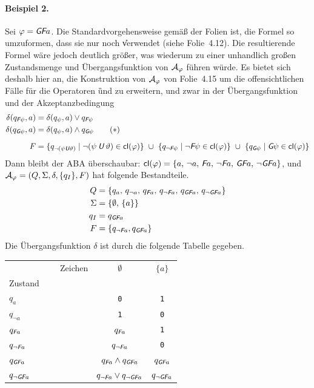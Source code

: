 \documentclass[fontsize=11pt, twoside=false, numbers=autoenddot]{scrbook}
\begin{document}
\paragraph*{Beispiel 2.}
Sei $\varphi = \textit{\textsf{G}}\textit{\textsf{F}} a$.
Die Standardvorgehensweise gemäß der Folien ist,
die Formel so umzuformen, dass sie nur noch \U verwendet
(siehe Folie~4.12).
Die resultierende Formel wäre jedoch deutlich größer,
was wiederum zu einer unhandlich großen Zustandsmenge und Übergangsfunktion von $\mathcal{A}_\varphi$ führen würde.
Es bietet sich deshalb hier an, die Konstruktion von $\mathcal{A}_\varphi$ von Folie~4.15
um die offensichtlichen Fälle für die Operatoren \G und \F zu erweitern,
und zwar in der Übergangsfunktion und der Akzeptanzbedingung
%
\begin{align*}
  \delta(q_{\textit{\textsf{F}}\psi},a) & = \delta(q_\psi,a) \lor q_{\textit{\textsf{F}}\psi}  \\
  \delta(q_{\textit{\textsf{G}}\psi},a) & = \delta(q_\psi,a) \land q_{\textit{\textsf{G}}\psi} \tag{$*$}\\[.4\baselineskip]
  F & = \{q_{\lnot(\psi\mathbin{\textit{\textsf{U}}} \vartheta)} \mid \lnot(\psi\mathbin{\textit{\textsf{U}}} \vartheta) \in \textsf{cl}(\varphi) \}
        ~\cup~ \{q_{\lnot\textit{\textsf{F}}\psi} \mid \lnot\textit{\textsf{F}}\psi \in \textsf{cl}(\varphi) \}
        ~\cup~ \{q_{\textit{\textsf{G}}\psi} \mid \textit{\textsf{G}}\psi \in \textsf{cl}(\varphi) \}
\end{align*}
%
Dann bleibt der ABA überschaubar: $\textsf{cl}(\varphi) = \{a,\,\lnot a,\,\textit{\textsf{F}} a,\,\lnot \textit{\textsf{F}} a,\,\textit{\textsf{G}}\textit{\textsf{F}} a,\,\lnot\textit{\textsf{G}}\textit{\textsf{F}} a\}$,
und $\mathcal{A}_\varphi = (Q,\Sigma,\delta,\{q_I\},F)$ hat folgende Bestandteile.
%
\begin{align*}
  Q      & = \{q_a,\,q_{\lnot a},\,q_{\textit{\textsf{F}} a},\,q_{\lnot\textit{\textsf{F}} a},\,q_{\textit{\textsf{G}}\textit{\textsf{F}} a},\,q_{\lnot\textit{\textsf{G}}\textit{\textsf{F}} a}\} \\
  \Sigma & = \{\emptyset,\,\{a\}\} \\
  q_I    & = q_{\textit{\textsf{G}}\textit{\textsf{F}} a} \\
  F      & = \{q_{\lnot\textit{\textsf{F}} a},q_{\textit{\textsf{G}}\textit{\textsf{F}} a}\}
\end{align*}
%
Die Übergangsfunktion $\delta$ ist durch die folgende Tabelle gegeben.
%
\begin{center}
  \begin{tabular}{l|cc}
    ~~~~~~~~~~~~Zeichen & $\emptyset$                             & $\{a\}$            \\
    Zustand             &                                         &                    \\
    \hline\rule{0pt}{11pt}%
    $q_a$               & \texttt{0}                              & \texttt{1}         \\[2pt]
    $q_{\lnot a}$       & \texttt{1}                              & \texttt{0}         \\[2pt]
    $q_{\textit{\textsf{F}} a}$          & $q_{\textit{\textsf{F}} a}$                              & \texttt{1}         \\[2pt]
    $q_{\lnot \textit{\textsf{F}} a}$    & $q_{\lnot\textit{\textsf{F}} a}$                         & \texttt{0}         \\[2pt]
    $q_{\textit{\textsf{G}}\textit{\textsf{F}} a}$        & $q_{\textit{\textsf{F}} a} \land q_{\textit{\textsf{G}}\textit{\textsf{F}} a}$             & $q_{\textit{\textsf{G}}\textit{\textsf{F}} a}$       \\[2pt]
    $q_{\lnot\textit{\textsf{G}}\textit{\textsf{F}} a}$   & $q_{\lnot \textit{\textsf{F}} a} \lor q_{\lnot \textit{\textsf{G}}\textit{\textsf{F}} a}$  & $q_{\lnot \textit{\textsf{G}}\textit{\textsf{F}} a}$
  \end{tabular}
\end{center}
\end{document}
